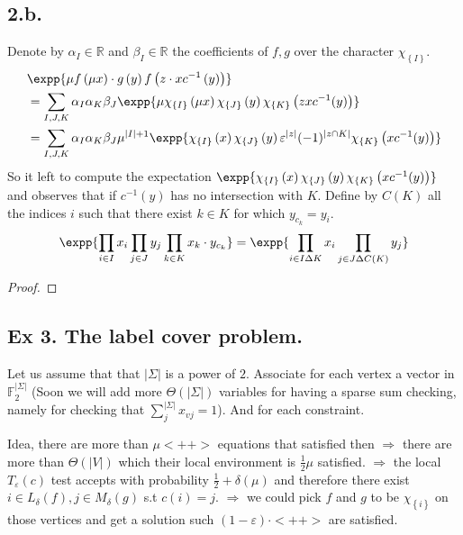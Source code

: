 \documentclass{article}
\newcommand{\Chi}[1]{\chi_{ \left\{ #1  \right\} } }
\begin{document}
\subsection{2.b.} 
Denote by $\alpha_{I} \in \mathbb{R}$ and $\beta_{I} \in \mathbb{R}$ the coefficients of $f,g$ over the character $\Chi{I}$.  
\begin{equation*}
  \begin{split}
    & \expp{\mu f\left( \mu x \right) \cdot g\left( y \right)f\left(z \cdot x c^{-1}\left( y \right)  \right)} \\
    & = \sum_{I,J,K}\alpha_{I}\alpha_{K}\beta_{J}\expp{ \mu \Chi{I}\left( \mu x \right)\Chi{J}\left( y \right) \Chi{K}\left( zx c^{-1}(y) \right) } \\
    & = \sum_{I,J,K}\alpha_{I}\alpha_{K}\beta_{J} \mu^{|I|+1}\expp{ \Chi{I}\left( x \right)\Chi{J}\left( y \right) \varepsilon^{|z|}(-1)^{|z \cap K|} \Chi{K}\left( x c^{-1}(y) \right) }   
  \end{split}
\end{equation*}
So it left to compute the expectation $ \expp{ \Chi{I}\left( x \right)\Chi{J}\left( y \right) \Chi{K}\left( x c^{-1}(y) \right) }$ and observes that if $c^{-1}(y)$ has no intersection with $K$. Define by $C(K)$ all the indices $i$ such that there exist $ k \in K$ for which $y_{c_{k}} = y_{i}$. 
\begin{equation*}
  \begin{split}
    \expp{\prod_{i \in I}{ x_{i}} \prod_{j \in J}{ y_{j}} \prod_{k \in K }{ x_{k}\cdot y_{c_{k}}} } = \expp{\prod_{i \in I \Delta K }{ x_{i}} \prod_{j \in J \Delta C(K) }{ y_{j}}}
  \end{split}
\end{equation*}
\begin{proof}
\end{proof}


\subsection{Ex 3. The label cover problem.} 
Let us assume that that $|\Sigma|$ is a power of $2$. Associate for each vertex a vector in $\mathbb{F}^{|\Sigma|}_{2}$ (Soon we will add more $\Theta(|\Sigma|)$ variables for having a sparse sum checking, namely for checking that $\sum_{j}^{|\Sigma|}{ x_{vj} }= 1$). And for each constraint. 

Idea, there are more than $\mu <++> $ equations that satisfied then $\Rightarrow$ there are more than $\Theta\left( |V| \right)$ which their local environment is $\frac{1}{2} \mu$ satisfied. $\Rightarrow$ the local $T_{\varepsilon}(c)$ test accepts with probability $\frac{1}{2}+\delta (\mu)$ and therefore there exist $i \in L_{\delta}(f),j \in M_{\delta}(g)$ s.t $c(i) = j       $. $\Rightarrow$ we could pick $f$ and $g$ to be $\Chi{i}$ on those vertices and get a solution such $\left(1-\varepsilon\right) \cdot <++> $ are satisfied.    
\end{document}

